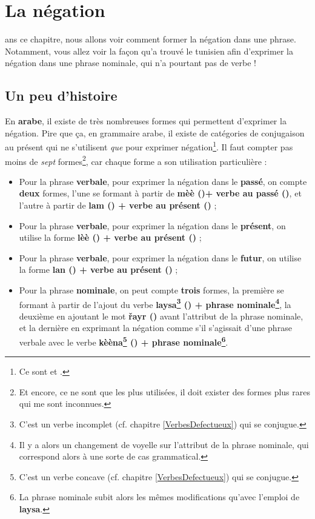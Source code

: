 \chapter{La négation}\label{Négation}
ans ce chapitre, nous allons voir comment former la négation dans une phrase. Notamment, vous allez voir la façon qu'a trouvé le tunisien afin \linebreak d'exprimer la négation dans une phrase nominale, qui n'a pourtant pas de verbe ! 

\section{Un peu d'histoire}
En \textbf{arabe}, il existe de très nombreuses formes qui permettent d'exprimer la négation. Pire que ça, en grammaire arabe, il existe de catégories de conjugaison au présent qui ne s'utilisent \textit{que} pour exprimer négation\footnote{Ce sont  et .}. Il faut compter pas moins de \textit{sept} formes\footnote{Et encore, ce ne sont que les plus utilisées, il doit exister des formes plus rares qui me sont inconnues.}, car chaque forme a son utilisation particulière :

\begin{itemize}
    \item Pour la phrase \textbf{verbale}, pour exprimer la négation dans le \textbf{passé}, on compte \textbf{deux} formes, l'une se formant à partir de \textbf{mèè ()+ verbe au passé ()}, et l'autre à partir de \textbf{lam () + verbe au présent ()} ;
    \item Pour la phrase \textbf{verbale}, pour exprimer la négation dans le \textbf{présent}, on utilise la forme \textbf{lèè () + verbe au présent ()} ; 
    \item Pour la phrase \textbf{verbale}, pour exprimer la négation dans le \textbf{futur}, on utilise la forme \textbf{lan () + verbe au présent ()} ;
    \item Pour la phrase \textbf{nominale}, on peut compte \textbf{trois} formes, la première se formant à partir de l'ajout du verbe \textbf{laysa\footnote{C'est un verbe incomplet (cf. chapitre \ref{VerbesDefectueux}) qui se conjugue.} () + phrase nominale\footnote{Il y a alors un changement de voyelle sur l'attribut de la phrase nominale, qui correspond alors à une sorte de cas grammatical.}}, la deuxième en ajoutant le mot \textbf{\v{r}ayr ()} avant l'attribut de la phrase nominale, et la dernière en exprimant la négation comme s'il s'agissait d'une phrase verbale avec le verbe \textbf{kèèna\footnote{C'est un verbe concave (cf. chapitre \ref{VerbesDefectueux}) qui se conjugue.} () + phrase nominale\footnote{La phrase nominale subit alors les mêmes modifications qu'avec l'emploi de \textbf{laysa}.}}.
\end{itemize}

